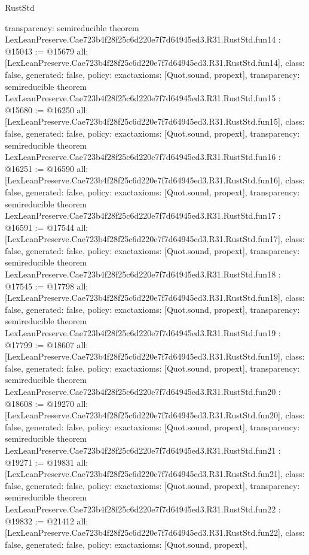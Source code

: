 \begin{lexlean}{RustStd}
\begin{coremodule}
{  transparency: semireducible
}
theorem LexLeanPreserve.Cae723b4f28f25c6d220e7f7d64945ed3.R31.RustStd.fun14 : @15043 := @15679 {
  all: [LexLeanPreserve.Cae723b4f28f25c6d220e7f7d64945ed3.R31.RustStd.fun14],
  class: false,
  generated: false,
  policy: exact{axioms: [Quot.sound, propext]},
  transparency: semireducible
}
theorem LexLeanPreserve.Cae723b4f28f25c6d220e7f7d64945ed3.R31.RustStd.fun15 : @15680 := @16250 {
  all: [LexLeanPreserve.Cae723b4f28f25c6d220e7f7d64945ed3.R31.RustStd.fun15],
  class: false,
  generated: false,
  policy: exact{axioms: [Quot.sound, propext]},
  transparency: semireducible
}
theorem LexLeanPreserve.Cae723b4f28f25c6d220e7f7d64945ed3.R31.RustStd.fun16 : @16251 := @16590 {
  all: [LexLeanPreserve.Cae723b4f28f25c6d220e7f7d64945ed3.R31.RustStd.fun16],
  class: false,
  generated: false,
  policy: exact{axioms: [Quot.sound, propext]},
  transparency: semireducible
}
theorem LexLeanPreserve.Cae723b4f28f25c6d220e7f7d64945ed3.R31.RustStd.fun17 : @16591 := @17544 {
  all: [LexLeanPreserve.Cae723b4f28f25c6d220e7f7d64945ed3.R31.RustStd.fun17],
  class: false,
  generated: false,
  policy: exact{axioms: [Quot.sound, propext]},
  transparency: semireducible
}
theorem LexLeanPreserve.Cae723b4f28f25c6d220e7f7d64945ed3.R31.RustStd.fun18 : @17545 := @17798 {
  all: [LexLeanPreserve.Cae723b4f28f25c6d220e7f7d64945ed3.R31.RustStd.fun18],
  class: false,
  generated: false,
  policy: exact{axioms: [Quot.sound, propext]},
  transparency: semireducible
}
theorem LexLeanPreserve.Cae723b4f28f25c6d220e7f7d64945ed3.R31.RustStd.fun19 : @17799 := @18607 {
  all: [LexLeanPreserve.Cae723b4f28f25c6d220e7f7d64945ed3.R31.RustStd.fun19],
  class: false,
  generated: false,
  policy: exact{axioms: [Quot.sound, propext]},
  transparency: semireducible
}
theorem LexLeanPreserve.Cae723b4f28f25c6d220e7f7d64945ed3.R31.RustStd.fun20 : @18608 := @19270 {
  all: [LexLeanPreserve.Cae723b4f28f25c6d220e7f7d64945ed3.R31.RustStd.fun20],
  class: false,
  generated: false,
  policy: exact{axioms: [Quot.sound, propext]},
  transparency: semireducible
}
theorem LexLeanPreserve.Cae723b4f28f25c6d220e7f7d64945ed3.R31.RustStd.fun21 : @19271 := @19831 {
  all: [LexLeanPreserve.Cae723b4f28f25c6d220e7f7d64945ed3.R31.RustStd.fun21],
  class: false,
  generated: false,
  policy: exact{axioms: [Quot.sound, propext]},
  transparency: semireducible
}
theorem LexLeanPreserve.Cae723b4f28f25c6d220e7f7d64945ed3.R31.RustStd.fun22 : @19832 := @21412 {
  all: [LexLeanPreserve.Cae723b4f28f25c6d220e7f7d64945ed3.R31.RustStd.fun22],
  class: false,
  generated: false,
  policy: exact{axioms: [Quot.sound, propext]},
}
\end{coremodule}
\end{lexlean}

